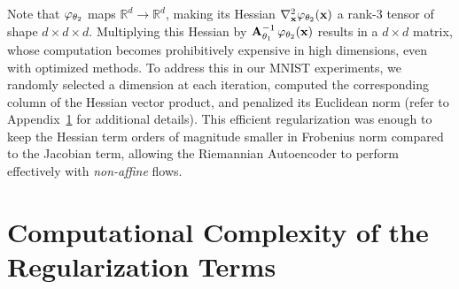 
Note that \(\varphi_{\theta_2}\) maps \(\mathbb{R}^d \to \mathbb{R}^d\), making its Hessian \(\nabla_{\mathbf{x}}^2 \varphi_{\theta_2}(\mathbf{x})\) a rank-3 tensor of shape \(d \times d \times d\). Multiplying this Hessian by \(\mathbf{A}_{\theta_1}^{-1}\,\varphi_{\theta_2}(\mathbf{x})\) results in a \(d \times d\) matrix, whose computation becomes prohibitively expensive in high dimensions, even with optimized methods. To address this in our MNIST experiments, we randomly selected a dimension at each iteration, computed the corresponding column of the Hessian vector product, and penalized its Euclidean norm (refer to Appendix~\ref{app:complexity-training} for additional details). This efficient regularization was enough to keep the Hessian term orders of magnitude smaller in Frobenius norm compared to the Jacobian term, allowing the Riemannian Autoencoder to perform effectively with \textit{non-affine} flows.

\section{Computational Complexity of the Regularization Terms}\label{app:complexity-training}

